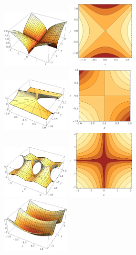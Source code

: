 \begin{center}
\includegraphics[width=0.25\textwidth]{Billeder/sqrt.png}
\includegraphics[width=0.25\textwidth]{Billeder/hyperbelniveau.png}\\
\includegraphics[width=0.25\textwidth]{Billeder/xdivy.png}
\includegraphics[width=0.25\textwidth]{Billeder/xyniveau.png}\\
\includegraphics[width=0.25\textwidth]{Billeder/cosxy.png}
\includegraphics[width=0.25\textwidth]{Billeder/sqrtniveau.png}\\
\includegraphics[width=0.25\textwidth]{Billeder/cosxx.png}

\end{center}
